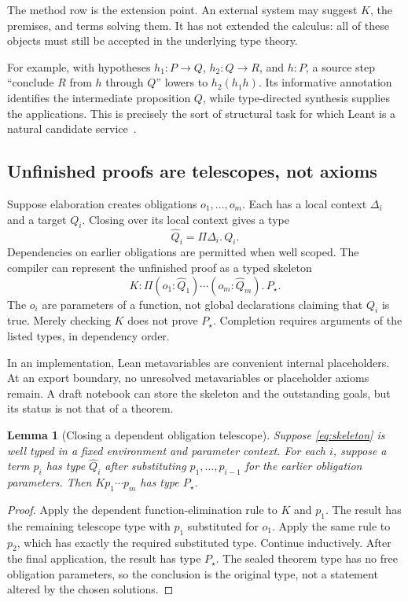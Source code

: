 \documentclass[11pt,a4paper]{article}
\newtheorem{lemma}[proposition]{Lemma}
\theoremstyle{remark}
\begin{document}
The method row is the extension point. An external system may suggest $K$, the premises, and terms solving them. It has not extended the calculus: all of these objects must still be accepted in the underlying type theory.

For example, with hypotheses $h_1:P\to Q$, $h_2:Q\to R$, and $h:P$, a source step ``conclude $R$ from $h$ through $Q$'' lowers to $h_2(h_1h)$. Its informative annotation identifies the intermediate proposition $Q$, while type-directed synthesis supplies the applications. This is precisely the sort of structural task for which Leant is a natural candidate service~\cite{leant-readme}.

\subsection{Unfinished proofs are telescopes, not axioms}

Suppose elaboration creates obligations $o_1,\ldots,o_m$. Each has a local context $\Delta_i$ and a target $Q_i$. Closing over its local context gives a type
\[
\widehat Q_i=\Pi\Delta_i.\,Q_i.
\]
Dependencies on earlier obligations are permitted when well scoped. The compiler can represent the unfinished proof as a typed skeleton
\begin{equation}
K:\Pi(o_1:\widehat Q_1)\cdots(o_m:\widehat Q_m).\,P_\star.
\label{eq:skeleton}
\end{equation}
The $o_i$ are parameters of a function, not global declarations claiming that $Q_i$ is true. Merely checking $K$ does not prove $P_\star$. Completion requires arguments of the listed types, in dependency order.

In an implementation, Lean metavariables are convenient internal placeholders. At an export boundary, no unresolved metavariables or placeholder axioms remain. A draft notebook can store the skeleton and the outstanding goals, but its status is not that of a theorem.

\begin{lemma}[Closing a dependent obligation telescope]
\label{lem:substitution}
Suppose \eqref{eq:skeleton} is well typed in a fixed environment and parameter context. For each $i$, suppose a term $p_i$ has type $\widehat Q_i$ after substituting $p_1,\ldots,p_{i-1}$ for the earlier obligation parameters. Then $Kp_1\cdots p_m$ has type $P_\star$.
\end{lemma}
\begin{proof}
Apply the dependent function-elimination rule to $K$ and $p_1$. The result has the remaining telescope type with $p_1$ substituted for $o_1$. Apply the same rule to $p_2$, which has exactly the required substituted type. Continue inductively. After the final application, the result has type $P_\star$. The sealed theorem type has no free obligation parameters, so the conclusion is the original type, not a statement altered by the chosen solutions.
\end{proof}
\end{document}
